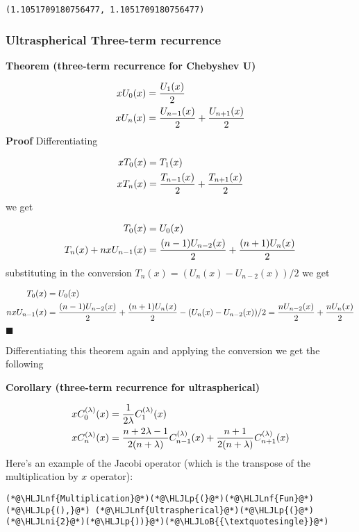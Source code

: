 \documentclass[12pt,a4paper]{article}
\newcommand{\HLJLnf}[1]{\textcolor[RGB]{66,102,213}{#1}}
\newcommand{\HLJLni}[1]{\textcolor[RGB]{59,151,46}{#1}}
\newcommand{\HLJLoB}[1]{\textcolor[RGB]{102,102,102}{\textbf{#1}}}
\newcommand{\HLJLp}[1]{#1}
\begin{document}
\begin{lstlisting}
(1.1051709180756477, 1.1051709180756477)
\end{lstlisting}


\subsubsection{Ultraspherical Three-term recurrence}
\textbf{Theorem (three-term recurrence for Chebyshev U)}


\begin{align*}
x U_0(x) &= {U_1(x) \over 2} \\
x U_n(x) &= {U_{n-1}(x) \over 2} + {U_{n+1}(x) \over 2}
\end{align*}
\textbf{Proof} Differentiating


\begin{align*}
 x T_0(x) &= T_1(x) \\
x T_n(x)  &=  {T_{n-1}(x) \over 2} + {T_{n+1}(x) \over 2}
\end{align*}
we get


\begin{align*}
  T_0(x) &= U_0(x) \\
 T_n(x) + n x U_{n-1}(x)  &=  {(n-1) U_{n-2}(x) \over 2} + {(n+1) U_n(x) \over 2}
\end{align*}
substituting in the conversion $T_n(x) = (U_n(x) - U_{n-2}(x))/2$ we get


\begin{align*}
  T_0(x) &= U_0(x) \\
 n x U_{n-1}(x)  &=  {(n-1) U_{n-2}(x) \over 2} + {(n+1) U_n(x) \over 2} - (U_n(x) - U_{n-2}(x))/2 = {n U_{n-2}(x) \over 2} + {n U_n(x) \over 2}
\end{align*}
\ensuremath{\blacksquare}

Differentiating this theorem again and applying the conversion we get the following

\textbf{Corollary (three-term recurrence for ultraspherical)}


\begin{align*}
x C_0^{(\lambda)}(x) &= {1 \over 2\lambda } C_1^{(\lambda)}(x) \\
 x C_n^{(\lambda)}(x) &=  {n+2\lambda-1 \over 2(n+\lambda)} C_{n-1}^{(\lambda)}(x) + {n+1 \over 2(n+\lambda)} C_{n+1}^{(\lambda)}(x)
\end{align*}
Here's an example of the Jacobi operator (which is the transpose of the multiplication by $x$ operator):


\begin{lstlisting}
(*@\HLJLnf{Multiplication}@*)(*@\HLJLp{(}@*)(*@\HLJLnf{Fun}@*)(*@\HLJLp{(),}@*) (*@\HLJLnf{Ultraspherical}@*)(*@\HLJLp{(}@*)(*@\HLJLni{2}@*)(*@\HLJLp{))}@*)(*@\HLJLoB{{\textquotesingle}}@*)
\end{lstlisting}
\end{document}

